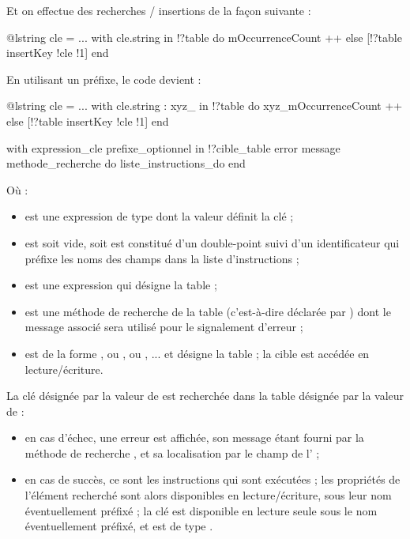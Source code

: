 {{{Et on effectue des recherches / insertions de la façon suivante :
\begin{galgascode}
@lstring cle = ...
with cle.string in !?table do
  mOccurrenceCount ++
else
  [!?table insertKey !cle !1]
end
\end{galgascode}

En utilisant un préfixe, le code devient :
\begin{galgascode}
@lstring cle = ...
with cle.string : xyz_ in !?table do
  xyz_mOccurrenceCount ++
else
  [!?table insertKey !cle !1]
end
\end{galgascode}





\begin{galgascode}
with expression_cle prefixe_optionnel in !?cible_table
error message methode_recherche
do liste_instructions_do
end
\end{galgascode}

Où :
\begin{itemize}
  \item {} est une expression de type  dont la valeur définit la clé ;
  \item {} est soit vide, soit est constitué d'un double-point \galgast{:} suivi d'un identificateur qui préfixe les noms des champs dans la liste d'instructions  ;
  \item {} est une expression qui désigne la table ;
  \item {} est une méthode de recherche de la table (c'est-à-dire déclarée par ) dont le message associé sera utilisé pour le signalement d'erreur ;
  \item {} est de la forme , ou  , ou , ... et désigne la table ; la cible est accédée en lecture/écriture.
\end{itemize}

La clé désignée par la valeur de  est recherchée dans la table désignée par la valeur de  :
\begin{itemize}
  \item en cas d'échec, une erreur est affichée, son message étant fourni par la méthode de recherche , et sa localisation par le champ  de l' ;
  \item en cas de succès, ce sont les instructions  qui sont exécutées ; les propriétés de l'élément recherché sont alors disponibles en lecture/écriture, sous leur nom éventuellement préfixé ; la clé est disponible en lecture seule sous le nom  éventuellement préfixé, et est de type .
\end{itemize}

}}}
